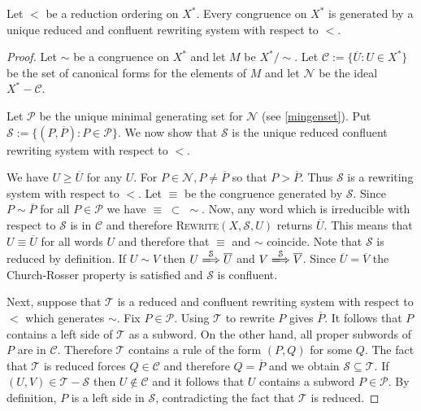 \begin{prop} Let $<$ be a reduction ordering on $X^*$. Every congruence on
    $X^*$ is generated by a unique reduced and confluent rewriting system with
    respect to $<$.
\end{prop}
\begin{proof} Let $\sim$ be a congruence on $X^*$ and let $M$ be $X^*/\sim$.
    Let $\mathcal{C} := \{\overline{U} : U \in X^*\}$ be the set of canonical
    forms for the elements of $M$ and let $\mathcal{N}$ be the ideal
    $X^*-\mathcal{C}$.

    Let $\mathcal{P}$ be the unique minimal generating set for $\mathcal{N}$
    (see \ref{mingenset}). Put $\mathcal{S} := \{(P,\overline{P}) : P \in
    \mathcal{P}\}.$ We now show that $\mathcal{S}$ is the unique reduced
    confluent rewriting system with respect to $<$.

    We have $U \ge \overline{U}$ for any $U$. For $P\in \mathcal{N}, P \neq
    \overline{P}$ so that $P > \overline{P}$. Thus $\mathcal{S}$ is a rewriting
    system with respect to $<$. Let $\equiv$ be the congruence generated by
    $\mathcal{S}$. Since $P \sim \overline{P}$ for all $P\in \mathcal{P}$ we
    have $\equiv \; \subset \; \sim$. Now, any word which is irreducible with
    respect to $\mathcal{S}$ is in $\mathcal{C}$ and therefore
    \textsc{Rewrite}$(X,\mathcal{S},U)$ returns $\overline{U}$. This means that
    $U \equiv \overline{U}$ for all words $U$ and therefore that $\equiv$ and
    $\sim$ coincide. Note that $\mathcal{S}$ is reduced by definition. If $U
    \sim V$ then $U\xLongrightarrow{\mathcal{S}} \overline{U}$ and $V
    \xLongrightarrow{\mathcal{S}} \overline{V}$. Since $\overline{U} =
    \overline{V}$ the Church-Rosser property is satisfied and $\mathcal{S}$ is
    confluent.

    Next, suppose that $\mathcal{T}$ is a reduced and confluent rewriting
    system with respect to $<$ which generates $\sim$. Fix $P \in \mathcal{P}$.
    Using $\mathcal{T}$ to rewrite ${P}$ gives $\overline{P}$. It follows that
    $P$ contains a left side of $\mathcal{T}$ as a subword. On the other hand,
    all proper subwords of $P$ are in $\mathcal{C}$. Therefore $\mathcal{T}$
    contains a rule of the form $(P,Q)$ for some $Q$. The fact that
    $\mathcal{T}$ is reduced forces $Q\in \mathcal{C}$ and therefore $Q =
    \overline{P}$ and we obtain $\mathcal{S} \subseteq \mathcal{T}$. If $(U,V)
    \in \mathcal{T}-\mathcal{S}$ then $U\notin \mathcal{C}$ and it follows that
    $U$ contains a subword $P\in \mathcal{P}$. By definition, $P$ is a left
    side in $\mathcal{S}$, contradicting the fact that $\mathcal{T}$ is
    reduced.
\end{proof}

